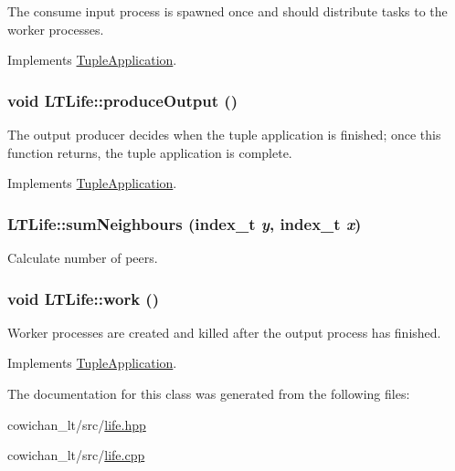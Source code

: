 The consume input process is spawned once and should distribute tasks to the worker processes. 

Implements \hyperlink{class_tuple_application_e163c5a536de01c8b94b49528a17dab2}{TupleApplication}.\hypertarget{class_l_t_life_a0ac21131813f89a94c6ba7515e63c11}{
\subsubsection[{produceOutput}]{\setlength{\rightskip}{0pt plus 5cm}void LTLife::produceOutput ()}}
\label{class_l_t_life_a0ac21131813f89a94c6ba7515e63c11}


The output producer decides when the tuple application is finished; once this function returns, the tuple application is complete. 

Implements \hyperlink{class_tuple_application_8743dfcf17dedd52887c0b2ab170d8dc}{TupleApplication}.\hypertarget{class_l_t_life_c63c1d93bcffbd2415d23a189c46bce7}{
\subsubsection[{sumNeighbours}]{ LTLife::sumNeighbours ({\bf index\_\-t} {\em y}, \/  {\bf index\_\-t} {\em x})}}
\label{class_l_t_life_c63c1d93bcffbd2415d23a189c46bce7}


Calculate number of peers. \hypertarget{class_l_t_life_c0600864c1742c2a12e15992c539c2da}{
\subsubsection[{work}]{\setlength{\rightskip}{0pt plus 5cm}void LTLife::work ()}}
\label{class_l_t_life_c0600864c1742c2a12e15992c539c2da}


Worker processes are created and killed after the output process has finished. 

Implements \hyperlink{class_tuple_application_ef6ae8bb1d697e4ed038b43320183c89}{TupleApplication}.

The documentation for this class was generated from the following files:\begin{CompactItemize}
\item 
cowichan\_\-lt/src/\hyperlink{life_8hpp}{life.hpp}\item 
cowichan\_\-lt/src/\hyperlink{cowichan__lt_2src_2life_8cpp}{life.cpp}\end{CompactItemize}
